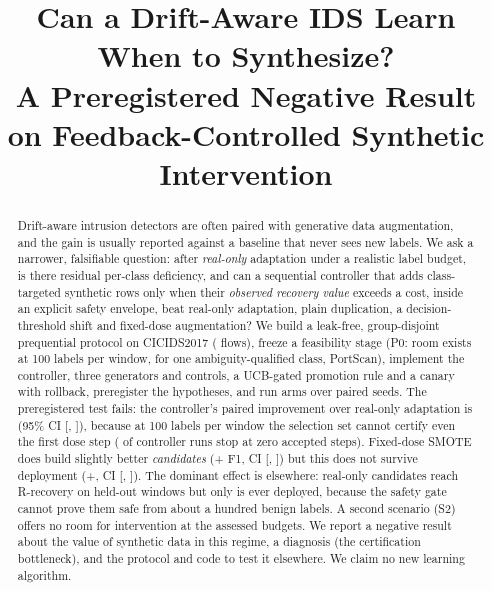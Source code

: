 \documentclass[conference]{IEEEtran}
\begin{document}
\title{Can a Drift-Aware IDS Learn When to Synthesize?\\
A Preregistered Negative Result on Feedback-Controlled Synthetic Intervention}

\author{
}

\maketitle

\begin{abstract}
Drift-aware intrusion detectors are often paired with generative data augmentation, and the gain is usually
reported against a baseline that never sees new labels. We ask a narrower, falsifiable question: after
\emph{real-only} adaptation under a realistic label budget, is there residual per-class deficiency, and can a
sequential controller that adds class-targeted synthetic rows only when their \emph{observed recovery value}
exceeds a cost, inside an explicit safety envelope, beat real-only adaptation, plain duplication, a decision-threshold
shift and fixed-dose augmentation? We build a leak-free, group-disjoint prequential protocol on CICIDS2017
(\nRows{} flows), freeze a feasibility stage (P0: room exists at 100 labels per window, for one ambiguity-qualified
class, PortScan), implement the controller, three generators and controls, a UCB-gated promotion rule and a canary
with rollback, preregister the hypotheses, and run \nArms{} arms over \nSeeds{} paired seeds. The preregistered
test fails: the controller's paired improvement over real-only adaptation is \HTwoMean{} (95\% CI
[\HTwoLo, \HTwoHi]), because at 100 labels per window the selection set cannot certify even the first dose
step (\eligibleKzero{} of \eligibleRuns{} controller runs stop at zero accepted steps). Fixed-dose SMOTE does build
slightly better \emph{candidates} (+\ShDiffFixedSmoteFourMean{} F1, CI [\ShDiffFixedSmoteFourLo, \ShDiffFixedSmoteFourHi]) but this
does not survive deployment (+\DepDiffFixedSmoteFourMean{}, CI [\DepDiffFixedSmoteFourLo, \DepDiffFixedSmoteFourHi]). The dominant
effect is elsewhere: real-only candidates reach R-recovery \ShRealOnlyMean{} on held-out windows but only
\RmRealOnlyMean{} is ever deployed, because the safety gate cannot prove them safe from about a hundred benign
labels. A second scenario (S2) offers no room for intervention at the assessed budgets. We report a negative result about the value of synthetic
data in this regime, a diagnosis (the certification bottleneck), and the protocol and code to test it elsewhere.
We claim no new learning algorithm.
\end{abstract}
\end{document}
